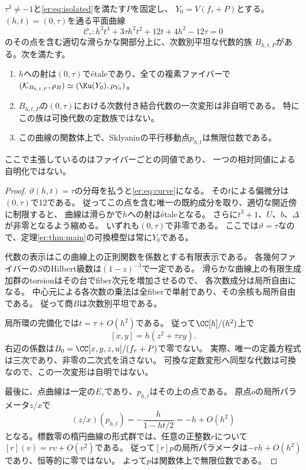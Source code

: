 \begin{theorem}[ファイバーごとに同じpairを持つ量子化族]\label{er:thm:isocategorical}
$\tau^3\ne-1$と\eqref{er:eq:isolated}を満たす$P$を固定し、
$Y_0=V(f_\tau+P)$とする。
$(h,t)=(0,\tau)$を通る平面曲線
\begin{equation}\label{er:eq:curve}
 \mathscr C_\tau:
 h^2t^3+3\tau h^2t^2+12t+4h^2-12\tau=0
\end{equation}
のその点を含む適切な滑らかな開部分上に、次数別平坦な代数的族
$B_{h,t,P}$がある。次を満たす。
\begin{enumerate}
 \item $h$への射は$(0,\tau)$でétaleであり、全ての複素ファイバーで
 $(\mathcal K_{B_{h,t,P}},\rho_B)\simeq(\Ku(Y_0),\rho_{Y_0})$。
 \item $B_{h,t,P}$の$(0,\tau)$における次数付き結合代数の一次変形は非自明である。
 特にこの族は可換代数の定数族ではない。
 \item この曲線の関数体上で、Sklyaninの平行移動点$p_{h,t}$は無限位数である。
\end{enumerate}
ここで主張しているのはファイバーごとの同値であり、
一つの相対同値による自明化ではない。
\end{theorem}
\begin{proof}
$\vartheta(h,t)=\tau$の分母を払うと\eqref{er:eq:curve}になる。
その$t$による偏微分は$(0,\tau)$で12である。
従ってこの点を含む唯一の既約成分を取り、適切な開近傍に制限すると、
曲線は滑らかで$h$への射はétaleとなる。
さらに$t^3+1$、$U$、$b$、$\Delta$が非零となるよう縮める。
いずれも$(0,\tau)$で非零である。
ここでは$\vartheta=\tau$なので、定理\ref{er:thm:main}の可換模型は常に$Y_0$である。

代数の表示はこの曲線上の正則関数を係数とする有限表示である。
各幾何ファイバーの$S$のHilbert級数は$(1-z)^{-3}$で一定である。
滑らかな曲線上の有限生成加群のtorsionはその台でfiber次元を増加させるので、
各次数成分は局所自由になる。
中心元による各次数の乗法は全fiberで単射であり、その余核も局所自由である。
従って商$B$は次数別平坦である。

局所環の完備化では$t=\tau+O(h^2)$である。
従って$\CC[h]/(h^2)$上で
\[
 [x,y]=h(z^2+\tau xy).
\]
右辺の係数は$B_0=\CC[x,y,z,u]/(f_\tau+P)$で零でない。
実際、唯一の定義方程式は三次であり、非零の二次式を消さない。
可換な定数変形へ同型な代数は可換なので、この一次変形は自明ではない。

最後に、点曲線は一定の$E_\tau$であり、$p_{h,t}$はその上の点である。
原点$o$の局所パラメータ$z/x$で
\[
 (z/x)(p_{h,t})=-\frac h{1-ht/2}=-h+O(h^2)
\]
となる。標数零の楕円曲線の形式群では、任意の正整数$r$について
$[r](v)=rv+O(v^2)$である。
従って$[r]p$の局所パラメータは$-rh+O(h^2)$であり、恒等的に零ではない。
よって$p$は関数体上で無限位数である。
\end{proof}

